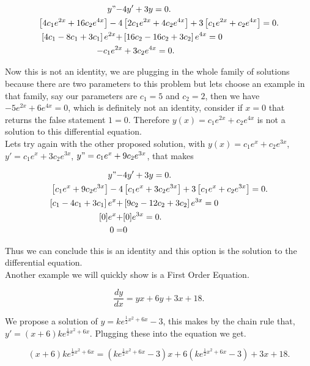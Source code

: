 \documentclass[12pt]{article}
\begin{document}
\begin{align*}
    y"-&4y'+3y=0. \\
    \left[4c_1e^{2x}+16c_2e^{4x}\right]-4&\left[2c_1e^{2x}+4c_2e^{4x}\right]+3\left[c_1e^{2x}+c_2e^{4x}\right]=0. \\
    \left[ 4c_1-8c_1+3c_1 \right]e^{2x} +& \left[16c_2-16c_2+3c_2 \right]e^{4x} = 0 \\
    -c_1e^{2x}&+3c_2e^{4x} = 0.
\end{align*}

Now this is not an identity, we are plugging in the whole family of solutions because there are two parameters to this problem but lets choose an example in that family, say our parameters are $c_1=5$ and $c_2=2$, then we have $-5e^{2x}+6e^{4x}=0$, which is definitely not an identity, consider if $x=0$ that returns the false statement $1=0$. Therefore $y(x)=c_1e^{2x}+c_2e^{4x}$ is not a solution to this differential equation. \\

Lets try again with the other proposed solution, with $y(x)=c_1e^x+c_2e^{3x}$, $y'=c_1e^x+3c_2e^{3x}$, $y"=c_1e^x+9c_2e^{3x}$, that makes

\begin{align*}
    y"-&4y'+3y=0. \\
    \left[c_1e^x+9c_2e^{3x} \right]-4&\left[c_1e^x+3c_2e^{3x} \right]+3\left[ c_1e^x+c_2e^{3x}\right]=0. \\
    \left[c_1-4c_1+3c_1 \right]e^{x} +& \left[9c_2-12c_2+3c_2 \right]e^{3x} = 0 \\
    [0]e^{x}+&[0]e^{3x} = 0. \\
     0=&0
\end{align*}

Thus we can conclude this is an identity and this option is the solution to the differential equation. \\

Another example we will quickly show is a First Order Equation.

\begin{equation*}
    \frac{dy}{dx} = yx+6y+3x+18.
\end{equation*}

We propose a solution of $y=ke^{\frac{1}{2}x^2+6x}-3$, this makes by the chain rule that, $y'=(x+6)ke^{\frac{1}{2}x^2+6x}$. Plugging these into the equation we get.

\begin{equation*}
    (x+6)ke^{\frac{1}{2}x^2+6x}=\left(ke^{\frac{1}{2}x^2+6x}-3\right)x+6\left(ke^{\frac{1}{2}x^2+6x}-3\right)+3x+18.
\end{equation*}
\end{document}
